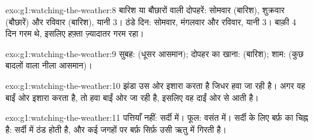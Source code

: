 \begin{solution}{exo:g1:watching-the-weather:8}
बारिश या बौछारों वाली दोपहरें: सोमवार (बारिश), शुक्रवार (बौछारें) और
रविवार (बारिश), यानी 3। ठंडे दिन: सोमवार, मंगलवार और रविवार, यानी 3।
बाक़ी 4 दिन गरम थे, इसलिए हफ़्ता ज़्यादातर गरम रहा।
\end{solution}

\begin{solution}{exo:g1:watching-the-weather:9}
सुबह:  (धूसर आसमान); दोपहर का खाना:  (बारिश);
शाम:  (कुछ बादलों वाला नीला आसमान)।
\end{solution}

\begin{solution}{exo:g1:watching-the-weather:10}
झंडा उस ओर इशारा करता है जिधर हवा जा रही है। अगर वह बाईं ओर इशारा करता
है, तो हवा बाईं ओर जा रही है, इसलिए वह दाईं ओर से आती है।
\end{solution}

\begin{solution}{exo:g1:watching-the-weather:11}
पत्तियाँ नहीं: सर्दी में। फूल: वसंत में। सर्दी के लिए बर्फ़ का चिह्न
है: सर्दी में ठंड होती है, और कई जगहों पर बर्फ़ सिर्फ़ उसी ऋतु में गिरती है।
\end{solution}
